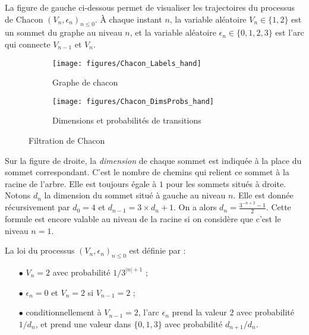 \documentclass[12pt,a4paper]{article}
\begin{document}
La figure de gauche ci-dessous permet de visualiser 
les trajectoires du processus de Chacon 
${(V_n, \epsilon_n)}_{n \leq 0}$.   
À chaque instant $n$, la variable aléatoire $V_n \in \{1,2\}$ est un sommet 
du graphe au niveau $n$, et la variable aléatoire $\epsilon_n \in \{0, 1, 2, 3\}$ 
est l'arc qui connecte $V_{n-1}$ et $V_n$. 

\begin{figure}[!h]
   \centering
   \begin{subfigure}[t]{0.47\textwidth}
   \centering
   	\texttt{[image: figures/Chacon\_Labels\_hand]}
 		\caption{\footnotesize Graphe de chacon}\label{fig:ChaconLabels}
    \end{subfigure}              
   \quad
    \begin{subfigure}[t]{0.47\textwidth}
    \centering
   	\texttt{[image: figures/Chacon\_DimsProbs\_hand]}
 		\caption{\footnotesize Dimensions et probabilités de transitions}\label{fig:ChaconDimsProbs}
 	\end{subfigure}      

   \caption{Filtration de Chacon}\label{fig:ChaconGraph}
   \label{fig:ostro}
 \end{figure}

Sur la figure de droite, la \emph{dimension} de chaque sommet est indiquée à la place 
du sommet correspondant. C'est le nombre de chemins qui relient ce sommet à la racine 
de l'arbre. Elle est toujours égale à $1$ pour les sommets situés à droite. 
Notons $d_n$ la dimension du sommet situé à gauche au niveau $n$. 
Elle est donnée récursivement par $d_0=4$ et $d_{n-1} = 3 \times d_n+1$. 
On a alors $d_n=\frac{3^{-n+2}-1}{2}$. Cette formule est encore 
valable au niveau de la racine si on considère que c'est le niveau $n=1$. 

La loi du processus ${(V_n, \epsilon_n)}_{n \leq 0}$ est définie par :

\begin{itemize}
\item[$\bullet$] $V_n = 2$ avec probabilité $1/3^{|n|+1}$ ;

\item[$\bullet$] $\epsilon_n=0$ et $V_n=2$ si $V_{n-1}=2$ ;

\item[$\bullet$] conditionnellement à $V_{n-1}=2$, l'arc $\epsilon_n$ prend la 
valeur $2$ avec probabilité $1/d_{n}$, et prend une valeur dans 
$\{0,1,3\}$ avec probabilité $d_{n+1}/d_n$. 
\end{itemize}
\end{document}
